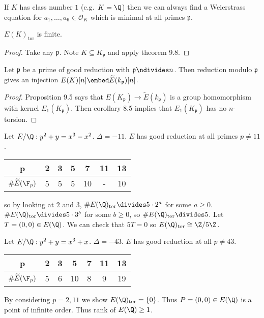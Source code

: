 \documentclass[a4paper]{article}
\theoremstyle{definition}
\theoremstyle{theorem}
\renewcommand*{\O}{\mathcal{O}}
\begin{document}
\begin{remark}
  If \(K\) has class number \(1\) (e.g.\ \(K = \Q\)) then we can always find a Weierstrass equation for \(a_1, \dots, a_6 \in \O_K\) which is minimal at all primes \(\mathfrak p\).
\end{remark}

\begin{lemma}
  \(E(K)_{\mathrm{tor}}\) is finite.
\end{lemma}

\begin{proof}
  Take any \(\mathfrak p\). Note \(K \subseteq K_{\mathfrak p}\) and apply theorem 9.8.
\end{proof}

\begin{lemma}
  Let \(\mathfrak p\) be a prime of good reduction with \(\mathfrak p \ndivides n\). Then reduction modulo \(\mathfrak p\) gives an injection \(E(K)[n] \embed \widetilde E(k_{\mathfrak p})[n]\).
\end{lemma}

\begin{proof}
  Proposition 9.5 says that \(E(K_{\mathfrak p}) \to \widetilde E(k_{\mathfrak p})\) is a group homomorphism with kernel \(E_1(K_{\mathfrak p})\). Then corollary 8.5 implies that \(E_1(K_{\mathfrak p})\) has no \(n\)-torsion.
\end{proof}

\begin{eg}
  Let \(E/\Q: y^2 + y = x^3 - x^2\). \(\Delta = -11\). \(E\) has good reduction at all primes \(p \neq 11\).
  \begin{table}[h]
    \centering
    \begin{tabular}{c|cccccc}
      p & 2 & 3 & 5 & 7 & 11 & 13 \\ \hline
      \(\# \widetilde E(\F_p)\) & 5 & 5 & 5 & 10 & - & 10
    \end{tabular}
  \end{table}
  so by looking at \(2\) and \(3\), \(\#E(\Q)_{\mathrm{tor}} \divides 5 \cdot 2^a\) for some \(a \geq 0\). \(\#E(\Q)_{\mathrm{tor}} \divides 5 \cdot 3^b\) for some \(b \geq 0\), so \(\#E(\Q)_{\mathrm{tor}} \divides 5\). Let \(T = (0, 0) \in E(\Q)\). We can check that \(5T = 0\) so \(E(\Q)_{\mathrm{tor}} \cong \Z/5\Z\).
\end{eg}

\begin{eg}
  Let \(E/\Q: y^2 + y = x^3 + x\). \(\Delta = -43\). \(E\) has good reduction at all \(p \neq 43\).
  \begin{table}[h]
    \centering
    \begin{tabular}{c|cccccc}
      p & 2 & 3 & 5 & 7 & 11 & 13 \\ \hline
      \(\# \widetilde E(\F_p)\) & 5 & 6 & 10 & 8 & 9 & 19
    \end{tabular}
  \end{table}
  By considering \(p = 2, 11\) we show \(E(\Q)_{\mathrm{tor}} = \{0\}\). Thus \(P = (0, 0) \in E(\Q)\) is a point of infinite order. Thus rank of \(E(\Q) \geq 1\).
\end{eg}
\end{document}
